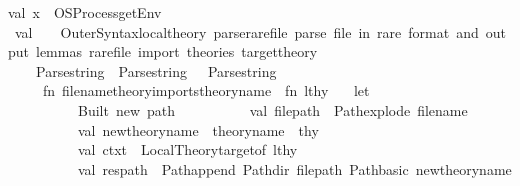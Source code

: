 \begin{isabellebody}
val\ x\ {\isacharequal}{\kern0pt}\ OS{\isachardot}{\kern0pt}Process{\isachardot}{\kern0pt}getEnv\isanewline
\isanewline
\ val\ {\isacharunderscore}{\kern0pt}\ {\isacharequal}{\kern0pt}\ \ Outer{\isacharunderscore}{\kern0pt}Syntax{\isachardot}{\kern0pt}local{\isacharunderscore}{\kern0pt}theory\ \isactrlcommandUNDERSCOREkeyword {\isasymopen}parse{\isacharunderscore}{\kern0pt}rare{\isacharunderscore}{\kern0pt}file{\isasymclose}\ {\isachardoublequote}{\kern0pt}parse\ file\ in\ rare\ format\ and\ output\ lemmas{\isachardot}{\kern0pt}\ {\isacharless}{\kern0pt}rare{\isacharunderscore}{\kern0pt}file{\isacharcomma}{\kern0pt}\ import\ theories{\isacharcomma}{\kern0pt}\ target{\isacharunderscore}{\kern0pt}theory{\isachargreater}{\kern0pt}{\isachardoublequote}{\kern0pt}\isanewline
\ \ \ \ {\isacharparenleft}{\kern0pt}{\isacharparenleft}{\kern0pt}{\isacharparenleft}{\kern0pt}Parse{\isachardot}{\kern0pt}string\ {\isacharminus}{\kern0pt}{\isacharminus}{\kern0pt}\ Parse{\isachardot}{\kern0pt}string{\isacharparenright}{\kern0pt}\ \ {\isacharminus}{\kern0pt}{\isacharminus}{\kern0pt}\ Parse{\isachardot}{\kern0pt}string{\isacharparenright}{\kern0pt}\isanewline
\ \ \ \ {\isachargreater}{\kern0pt}{\isachargreater}{\kern0pt}\ {\isacharparenleft}{\kern0pt}fn\ {\isacharparenleft}{\kern0pt}{\isacharparenleft}{\kern0pt}file{\isacharunderscore}{\kern0pt}name{\isacharcomma}{\kern0pt}theory{\isacharunderscore}{\kern0pt}imports{\isacharparenright}{\kern0pt}{\isacharcomma}{\kern0pt}theory{\isacharunderscore}{\kern0pt}name{\isacharparenright}{\kern0pt}\ {\isacharequal}{\kern0pt}{\isachargreater}{\kern0pt}\ fn\ lthy\ {\isacharequal}{\kern0pt}{\isachargreater}{\kern0pt}\isanewline
\ \ let\isanewline
\ \ \ \ \ \ \ \ \ \ {\isacharparenleft}{\kern0pt}{\isacharasterisk}{\kern0pt}Built\ new\ path{\isacharasterisk}{\kern0pt}{\isacharparenright}{\kern0pt}\isanewline
\ \ \ \ \ \ \ \ \ \ val\ file{\isacharunderscore}{\kern0pt}path\ {\isacharequal}{\kern0pt}\ Path{\isachardot}{\kern0pt}explode\ file{\isacharunderscore}{\kern0pt}name\isanewline
\ \ \ \ \ \ \ \ \ \ val\ new{\isacharunderscore}{\kern0pt}theory{\isacharunderscore}{\kern0pt}name\ {\isacharequal}{\kern0pt}\ theory{\isacharunderscore}{\kern0pt}name\ {\isacharcircum}{\kern0pt}\ {\isachardoublequote}{\kern0pt}{\isachardot}{\kern0pt}thy{\isachardoublequote}{\kern0pt}\isanewline
\ \ \ \ \ \ \ \ \ \ val\ ctxt\ {\isacharequal}{\kern0pt}\ Local{\isacharunderscore}{\kern0pt}Theory{\isachardot}{\kern0pt}target{\isacharunderscore}{\kern0pt}of\ lthy\isanewline
\ \ \ \ \ \ \ \ \ \ val\ res{\isacharunderscore}{\kern0pt}path\ {\isacharequal}{\kern0pt}\ Path{\isachardot}{\kern0pt}append\ {\isacharparenleft}{\kern0pt}Path{\isachardot}{\kern0pt}dir\ file{\isacharunderscore}{\kern0pt}path{\isacharparenright}{\kern0pt}\ {\isacharparenleft}{\kern0pt}Path{\isachardot}{\kern0pt}basic\ new{\isacharunderscore}{\kern0pt}theory{\isacharunderscore}{\kern0pt}name{\isacharparenright}{\kern0pt}\isanewline

\end{isabellebody}

